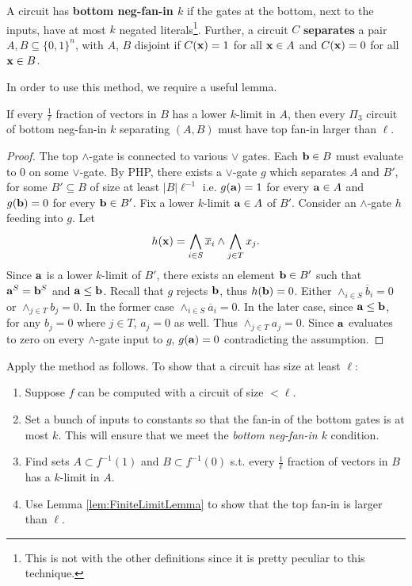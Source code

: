 \documentclass[11pt]{article}
\begin{document}
 	A circuit has \textbf{bottom neg-fan-in $k$} if the gates at the bottom, next to the inputs, have at most $k$ negated literals\footnote{This is not with the other definitions since it is pretty peculiar to this technique.}. Further, a circuit $C$ \textbf{separates} a pair $A, B \subseteq \{0,1\}^n$, with $A$, $B$ disjoint if $C(\mathbf{x}) = 1$ for all $\mathbf{x} \in A$ and $C(\mathbf{x}) = 0$ for all $\mathbf{x} \in B$.
 	
 	In order to use this method, we require a useful lemma.
 	\begin{lemma}
 		\label{lem:FiniteLimitLemma}
 		If every $\frac{1}{\ell}$ fraction of vectors in $B$ has a lower $k$-limit in $A$, then every $\Pi_3$ circuit of bottom neg-fan-in $k$ separating $(A, B)$ must have top fan-in larger than $\ell$. 
 	\end{lemma} 
 	\begin{proof}
 		The top $\land$-gate is connected to various $\lor$ gates. Each $\mathbf{b} \in B$ must evaluate to $0$ on some $\lor$-gate. By PHP, there exists a $\lor$-gate $g$ which separates $A$ and $B'$, for some $B' \subseteq B$ of size at least $|B|\ell^{-1}$ i.e. $g(\mathbf{a}) = 1$ for every $\mathbf{a} \in A$ and $g(\mathbf{b}) = 0$ for every $\mathbf{b} \in B'$. Fix a lower $k$-limit $\mathbf{a} \in A$ of $B'$. Consider an $\land$-gate $h$ feeding into $g$. Let
 		\[h(\mathbf{x}) = \bigwedge_{i \in S} \overline{x}_i \land \bigwedge_{j \in T} x_j.\] 
 		Since $\mathbf{a}$ is a lower $k$-limit of $B'$, there exists an element $\mathbf{b} \in B'$ such that $\mathbf{a}^{S} = \mathbf{b}^{S}$ and $\mathbf{a} \leq \mathbf{b}$. Recall that $g$ rejects $\mathbf{b}$, thus $h(\mathbf{b}) = 0$. Either $\wedge_{i \in S} \overline{b}_i = 0$ or $\wedge_{j \in T} b_j = 0$. In the former case $\wedge_{i \in S} \overline{a}_i = 0$. In the later case, since $\mathbf{a} \leq \mathbf{b}$, for any $b_j = 0$ where $j \in T$, $a_j = 0$ as well. Thus $\wedge_{j \in T} a_j = 0$. Since $\mathbf{a}$ evaluates to zero on every $\land$-gate input to $g$, $g(\mathbf{a}) = 0$ contradicting the assumption. 
 		 
 	\end{proof}
 
 	Apply the method as follows. To show that a circuit has size at least $\ell$:
 	\begin{enumerate}
 		\item Suppose $f$ can be computed with a circuit of size $< \ell$.
 		\item Set a bunch of inputs to constants so that the fan-in of the bottom gates is at most $k$. This will ensure that we meet the \emph{bottom neg-fan-in $k$} condition. 
 		\item Find sets $A \subset f^{-1}(1)$ and $B \subset f^{-1}(0)$ s.t. every $\frac{1}{\ell}$ fraction of vectors in $B$ has a $k$-limit in $A$.
 		\item Use Lemma \ref{lem:FiniteLimitLemma} to show that the top fan-in is larger than $\ell$.
 	\end{enumerate} 
 	
\end{document}
